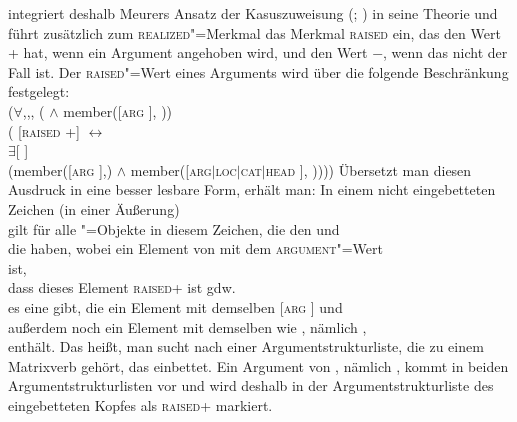 \citet{Prze99b} integriert deshalb Meurers Ansatz der Kasuszuweisung (\citeyear{Meurers99b}; \citeyear[Kapitel~10.4.1.4]{Meurers2000b})
in seine Theorie und führt zusätzlich zum \textsc{realized}"=Merkmal
das Merkmal \textsc{raised} ein, das den Wert + hat, wenn ein
Argument angehoben wird, und den Wert $-$, wenn das nicht der Fall ist.
Der \textsc{raised}"=Wert eines Arguments wird über die folgende Beschränkung
festgelegt:
\ea
\label{raised-wert}
 \impl\\
\mbox{}\hspace{3ex}($\forall$,,, (  $\wedge$ member([\textsc{arg}  ], )) \impl\\
\mbox{}\hspace{6ex}( [\textsc{raised} +] $\leftrightarrow$\\
\mbox{}\hspace{9ex}$\exists$[\argst {} ]\\
\mbox{}\hspace{9ex}(member([\textsc{arg}  ],) $\wedge$ member([\textsc{arg$|$loc$|$cat$|$head}  ], ))))
\z
Übersetzt man diesen Ausdruck in eine besser lesbare Form, erhält man:
\ea
In einem nicht eingebetteten Zeichen (\dash in einer Äußerung)\\
\mbox{}\hspace{3ex}gilt für alle "=Objekte in diesem Zeichen, die den \headw {} und\\
\mbox{}\hspace{3ex}die \argst {} haben, wobei  ein Element von  mit dem
     \textsc{argument}"=Wert \\
\mbox{}\hspace{3ex}ist,\\
\mbox{}\hspace{3ex}dass dieses Element  \textsc{raised}+ ist gdw.\ \\
\mbox{}\hspace{6ex}es eine \argstl gibt, die ein Element mit demselben [\textsc{arg}  ] und\\
\mbox{}\hspace{6ex}außerdem noch ein Element mit demselben \headw wie , nämlich ,\\
\mbox{}\hspace{6ex}enthält.
\z
Das heißt, man sucht nach einer Argumentstrukturliste, die zu einem Matrixverb gehört, das
 einbettet. Ein Argument von , nämlich , kommt in beiden Argumentstrukturlisten
vor und wird deshalb in der Argumentstrukturliste des eingebetteten Kopfes als \textsc{raised}+ markiert.

